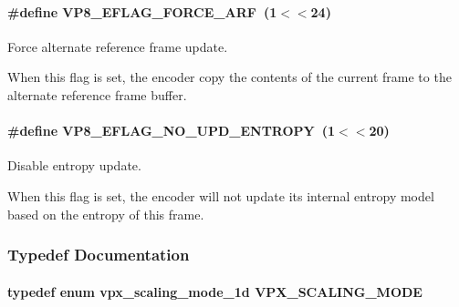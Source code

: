 \paragraph[{\texorpdfstring{V\+P8\+\_\+\+E\+F\+L\+A\+G\+\_\+\+F\+O\+R\+C\+E\+\_\+\+A\+RF}{VP8_EFLAG_FORCE_ARF}}]{\setlength{\rightskip}{0pt plus 5cm}\#define V\+P8\+\_\+\+E\+F\+L\+A\+G\+\_\+\+F\+O\+R\+C\+E\+\_\+\+A\+RF~(1$<$$<$24)}\hypertarget{group__vp8__encoder_ga50584fe4bdb62ff935347576539650b7}{}\label{group__vp8__encoder_ga50584fe4bdb62ff935347576539650b7}


Force alternate reference frame update. 

When this flag is set, the encoder copy the contents of the current frame to the alternate reference frame buffer. 
\paragraph[{\texorpdfstring{V\+P8\+\_\+\+E\+F\+L\+A\+G\+\_\+\+N\+O\+\_\+\+U\+P\+D\+\_\+\+E\+N\+T\+R\+O\+PY}{VP8_EFLAG_NO_UPD_ENTROPY}}]{\setlength{\rightskip}{0pt plus 5cm}\#define V\+P8\+\_\+\+E\+F\+L\+A\+G\+\_\+\+N\+O\+\_\+\+U\+P\+D\+\_\+\+E\+N\+T\+R\+O\+PY~(1$<$$<$20)}\hypertarget{group__vp8__encoder_ga5b91ad179910d4efc23aef66c7b2148b}{}\label{group__vp8__encoder_ga5b91ad179910d4efc23aef66c7b2148b}


Disable entropy update. 

When this flag is set, the encoder will not update its internal entropy model based on the entropy of this frame. 

\subsubsection{Typedef Documentation}
\paragraph[{\texorpdfstring{V\+P\+X\+\_\+\+S\+C\+A\+L\+I\+N\+G\+\_\+\+M\+O\+DE}{VPX_SCALING_MODE}}]{\setlength{\rightskip}{0pt plus 5cm}typedef enum {\bf vpx\+\_\+scaling\+\_\+mode\+\_\+1d}  {\bf V\+P\+X\+\_\+\+S\+C\+A\+L\+I\+N\+G\+\_\+\+M\+O\+DE}}\hypertarget{group__vp8__encoder_ga100ca891ad96995e61780ae777bf8663}{}\label{group__vp8__encoder_ga100ca891ad96995e61780ae777bf8663}


